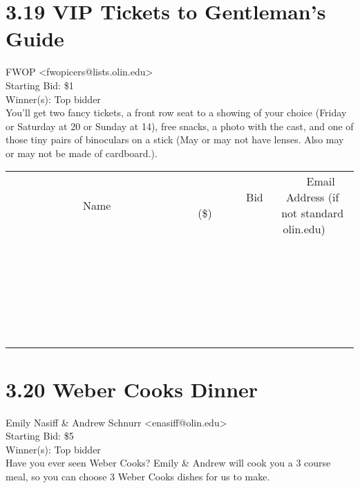 \documentclass[11pt]{article}
\begin{document}
					\section*{3.19 VIP Tickets to Gentleman's Guide}
					FWOP <fwopicers@lists.olin.edu> \\
					Starting Bid: \$1 \\
					Winner(s): Top bidder \\
					You'll get two fancy tickets, a front row seat to a showing of your choice (Friday or Saturday at 20 or Sunday at 14), free snacks, a photo with the cast, and one of those tiny pairs of binoculars on a stick (May or may not have lenses. Also may or may not be made of cardboard.). \\
					[6ex]
					\begin{tabular}{c c c}
						~~~~~~~~~~~~~Name~~~~~~~~~~~~~ & ~~~~~~~~~Bid (\$)~~~~~~~~~ & ~~~Email Address (if not standard olin.edu)~~~ \\
				
 & & \\
\hline
 & & \\
\hline
 & & \\
\hline
 & & \\
\hline
 & & \\
\hline
 & & \\
\hline
 & & \\
\hline
 & & \\
\hline
 & & \\
\hline
 & & \\
\hline
 & & \\
\hline
 & & \\
\hline
 & & \\
\hline
 & & \\
\hline
 & & \\
\hline
 & & \\
\hline
 & & \\
\hline
 & & \\
\hline
 & & \\
\hline
 & & \\
\hline
 & & \\
\hline
 & & \\
\hline
 & & \\
\hline
 & & \\
\hline
 & & \\
\hline
 & & \\
\hline
					\end{tabular}
					\clearpage
				
					\section*{3.20 Weber Cooks Dinner}
					Emily Nasiff \& Andrew Schnurr <enasiff@olin.edu> \\
					Starting Bid: \$5 \\
					Winner(s): Top bidder \\
					Have you ever seen Weber Cooks? Emily \& Andrew will cook you a 3 course meal, so you can choose 3 Weber Cooks dishes for us to make. 
\end{document}
